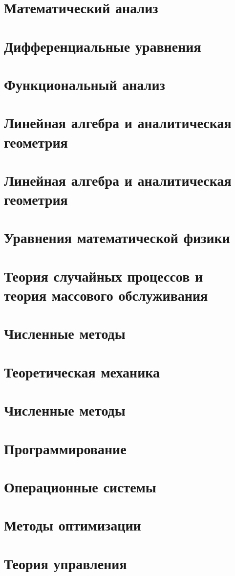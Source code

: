\documentclass[12pt,a4paper]{article}
\begin{document}
\section{Математический анализ}


\section{Дифференциальные уравнения}


\section{Функциональный анализ}


\section{Линейная алгебра и аналитическая геометрия}


\section{Линейная алгебра и аналитическая геометрия}


\section{Уравнения математической физики}


\section{Теория случайных процессов и теория массового обслуживания}


\section{Численные методы}


\section{Теоретическая механика}


\section{Численные методы}


\section{Программирование}


\section{Операционные системы}


\section{Методы оптимизации}


\section{Теория управления}

\end{document}
